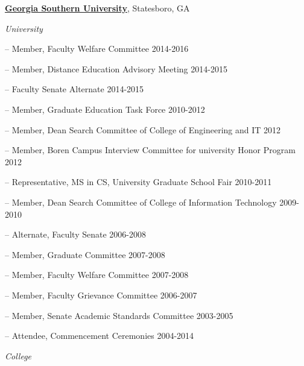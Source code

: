\documentclass[10pt]{article}
\begin{document}
\href{http://www.georgiasouthern.edu/}{\textbf{Georgia Southern University}},
Statesboro, GA
\begin{outerlist}

    \item[] \textit{University}
    
           \begin{innerlist}
		\item[--] Member, Faculty Welfare Committee \hfill{2014-2016}
		\item[--] Member, Distance Education Advisory Meeting \hfill{2014-2015}
		\item[--] Faculty Senate Alternate \hfill{2014-2015}
		\item[--] Member, Graduate Education Task Force \hfill{2010-2012}
		\item[--]  Member, Dean Search Committee of College of Engineering and IT \hfill{2012}
		\item[--]  Member, Boren Campus Interview Committee for university Honor Program  \hfill{2012}
		\item[--]  Representative, MS in CS, University Graduate School Fair \hfill{2010-2011}
		\item[--]  Member, Dean Search Committee of College of Information Technology \hfill{2009-2010}
		\item[--]  Alternate, Faculty Senate \hfill{2006-2008}
		\item[--]  Member, Graduate Committee \hfill{2007-2008}
		\item[--]  Member, Faculty Welfare Committee \hfill{2007-2008}
		\item[--]  Member, Faculty Grievance Committee \hfill{2006-2007}
		\item[--]  Member, Senate Academic Standards Committee \hfill{2003-2005}
		\item[--]  Attendee, Commencement Ceremonies  \hfill{2004-2014}
           \end{innerlist}
    
    \item[] \textit{College}
    

\end{outerlist}
\end{document}
